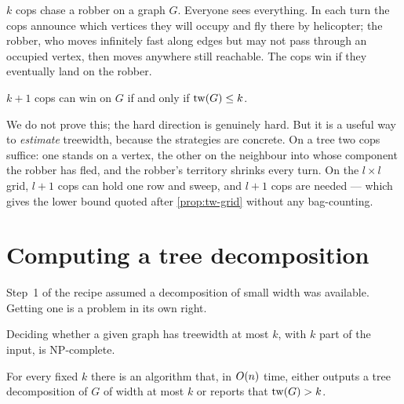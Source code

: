 \begin{definition}\label{def:cops-robber}
$k$ cops chase a robber on a graph $G$. Everyone sees everything. In each turn
the cops announce which vertices they will occupy and fly there by helicopter;
the robber, who moves infinitely fast along edges but may not pass through an
occupied vertex, then moves anywhere still reachable. The cops win if they
eventually land on the robber.
\end{definition}

\begin{theorem}\label{thm:cops-robber}
$k+1$ cops can win on $G$ if and only if $\mathrm{tw}(G) \le k$.
\end{theorem}

We do not prove this; the hard direction is genuinely hard. But it is a useful
way to \emph{estimate} treewidth, because the strategies are concrete. On a
tree two cops suffice: one stands on a vertex, the other on the neighbour into
whose component the robber has fled, and the robber's territory shrinks every
turn. On the $l \times l$ grid, $l+1$ cops can hold one row and sweep, and
$l+1$ cops are needed --- which gives the lower bound quoted after
\cref{prop:tw-grid} without any bag-counting.

\section{Computing a tree decomposition}
\label{sec:computing-treewidth}

Step~1 of the recipe assumed a decomposition of small width was available.
Getting one is a problem in its own right.

\begin{theorem}\label{thm:treewidth-npc}
Deciding whether a given graph has treewidth at most $k$, with $k$ part of the
input, is \textrm{NP}-complete.
\end{theorem}

\begin{theorem}\label{thm:bodlaender}
For every fixed $k$ there is an algorithm that, in $O\!\left(n\right)$ time, either
outputs a tree decomposition of $G$ of width at most $k$ or reports that
$\mathrm{tw}(G) > k$.
\end{theorem}

